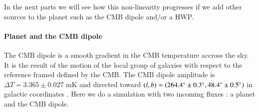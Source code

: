 
In the next parts we will see how this non-linearity progresses if we add other sources to the planet such as the CMB dipole and/or a HWP.

\paragraph{Planet and the CMB dipole \\}

The CMB dipole is a smooth gradient in the CMB temperature accross the sky. It is the result of the motion of the local group of galaxies with respect to the reference framed defined by the CMB. The CMB dipole amplitude is $\Delta T = 3.365 \pm 0.027$ mK and directed toward $(l,b) = (264.4 \degree \pm 0.3 \degree , 48.4 \degree \pm 0.5 \degree)$ in galactic coordinates \citep{2015IJMPD..2430004B}. Here we do a simulation with two incoming fluxes : a planet and the CMB dipole. 



